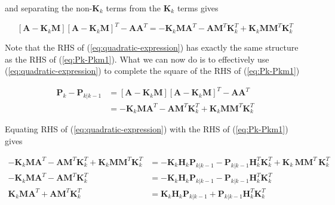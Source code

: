 \documentclass[12pt]{article}
\begin{document}
and separating the non-$\mathbf{K}_k$ terms from the $\mathbf{K}_k$ terms gives

\begin{equation}
    \left[ \mathbf{A} - \mathbf{K}_k \mathbf{M} \right] \left[ \mathbf{A} - \mathbf{K}_k \mathbf{M} \right]^T - \mathbf{A} \mathbf{A}^T
    = - \mathbf{K}_k \mathbf{M} \mathbf{A}^T - \mathbf{A} \mathbf{M}^T \mathbf{K}_k^T + \mathbf{K}_k \mathbf{M} \mathbf{M}^T \mathbf{K}_k^T
    \label{eq:quadratic-expression}
\end{equation}

Note that the RHS of (\ref{eq:quadratic-expression}) has exactly the same structure as the
RHS of (\ref{eq:Pk-Pkm1}).
What we can now do is to effectively use (\ref{eq:quadratic-expression}) to complete the
square of the RHS of (\ref{eq:Pk-Pkm1})

\begin{equation}
    \begin{aligned}
        \mathbf{P}_{k} - \mathbf{P}_{k|k-1}
        &= \left[ \mathbf{A} - \mathbf{K}_k \mathbf{M} \right] \left[ \mathbf{A} - \mathbf{K}_k \mathbf{M} \right]^T - \mathbf{A} \mathbf{A}^T \\
        &= - \mathbf{K}_k \mathbf{M} \mathbf{A}^T - \mathbf{A} \mathbf{M}^T \mathbf{K}_k^T + \mathbf{K}_k \mathbf{M} \mathbf{M}^T \mathbf{K}_k^T
    \end{aligned}
    \label{eq:P-completed-square}
\end{equation}

Equating RHS of (\ref{eq:quadratic-expression}) with the RHS of (\ref{eq:Pk-Pkm1}) gives

\begin{equation*}
    \begin{aligned}
        - \mathbf{K}_k \mathbf{M} \mathbf{A}^T - \mathbf{A} \mathbf{M}^T \mathbf{K}_k^T + \mathbf{K}_k \mathbf{M} \mathbf{M}^T \mathbf{K}_k^T &=
        - \mathbf{K}_k \mathbf{H}_k \mathbf{P}_{k|k-1} - \mathbf{P}_{k|k-1} \mathbf{H}_k^T \mathbf{K}_k^T + \mathbf{K}_k \, \mathbf{M} \mathbf{M}^T \, \mathbf{K}_k^T \\
        - \mathbf{K}_k \mathbf{M} \mathbf{A}^T - \mathbf{A} \mathbf{M}^T \mathbf{K}_k^T &=
        - \mathbf{K}_k \mathbf{H}_k \mathbf{P}_{k|k-1} - \mathbf{P}_{k|k-1} \mathbf{H}_k^T \mathbf{K}_k^T \\
        \mathbf{K}_k \mathbf{M} \mathbf{A}^T + \mathbf{A} \mathbf{M}^T \mathbf{K}_k^T &=
        \mathbf{K}_k \mathbf{H}_k \mathbf{P}_{k|k-1} + \mathbf{P}_{k|k-1} \mathbf{H}_k^T \mathbf{K}_k^T
    \end{aligned}
\end{equation*}
\end{document}
